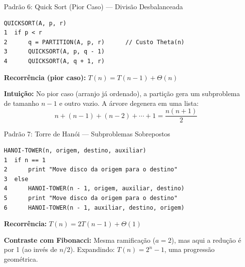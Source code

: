 \documentclass[aspectratio=169]{beamer}
\begin{document}
\begin{frame}{Padrão 6: Quick Sort (Pior Caso) --- Divisão Desbalanceada}
\begin{verbatim}
QUICKSORT(A, p, r)
1  if p < r
2      q = PARTITION(A, p, r)      // Custo Theta(n)
3      QUICKSORT(A, p, q - 1)
4      QUICKSORT(A, q + 1, r)
\end{verbatim}
    \textbf{Recorrência (pior caso):} $T(n) = T(n-1) + \Theta(n)$
    
    \vspace{0.2cm}
    \textbf{Intuição:} No pior caso (arranjo já ordenado), a partição gera um subproblema de tamanho $n{-}1$ e outro vazio. A árvore degenera em uma lista:
    $$n + (n{-}1) + (n{-}2) + \cdots + 1 = \frac{n(n+1)}{2}$$
    
    \hfill{}
\end{frame}

\begin{frame}{Padrão 7: Torre de Hanói --- Subproblemas Sobrepostos}
\begin{verbatim}
HANOI-TOWER(n, origem, destino, auxiliar)
1  if n == 1
2      print "Move disco da origem para o destino"
3  else
4      HANOI-TOWER(n - 1, origem, auxiliar, destino)
5      print "Move disco da origem para o destino"
6      HANOI-TOWER(n - 1, auxiliar, destino, origem)
\end{verbatim}
    \textbf{Recorrência:} $T(n) = 2T(n-1) + \Theta(1)$
    
    \vspace{0.2cm}
    \textbf{Contraste com Fibonacci:} Mesma ramificação ($a = 2$), mas aqui a redução é por 1 (ao invés de $n/2$). Expandindo: $T(n) = 2^n - 1$, uma progressão geométrica.
    
    \vspace{0.1cm}
    \hfill{}
\end{frame}
\end{document}
